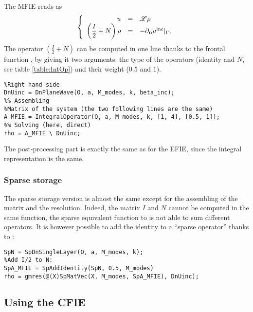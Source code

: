 The MFIE reads as
$$
\left\{\begin{array}{r c l}
u &=& {\mathscr L}\rho\\
\displaystyle \left(\frac{I}{2}+N\right)\rho &=& -\partial_{\mathbf{n}}u^{\textrm{inc}}|_{\Gamma}.
\end{array}\right.
$$
The operator $\left(\frac{I}{2}+N\right)$ can be computed in one line thanks to the frontal function \IntegralOperator, by giving it two arguments: the type of the operators (identity and $N$, see table \ref{table:IntOp}) and their weight ($0.5$ and $1$). 
\begin{lstlisting}
%Right hand side
DnUinc = DnPlaneWave(O, a, M_modes, k, beta_inc);
%% Assembling
%Matrix of the system (the two following lines are the same)
A_MFIE = IntegralOperator(O, a, M_modes, k, [1, 4], [0.5, 1]);
%% Solving (here, direct)
rho = A_MFIE \ DnUinc;
\end{lstlisting}

The post-processing part is exactly the same as for the EFIE, since the integral representation is the same.

\subsubsection{Sparse storage}

The sparse storage version is almost the same except for the assembling of the matrix and the resolution. Indeed, the matrix $I$ and $N$ cannot be computed in the same function, the sparse equivalent function \SpIntegralOperator to \IntegralOperator is not able to sum different operators. It is however possible to add the identity to a ``sparse operator'' thanks to \SpAddIdentity:
\begin{lstlisting}
SpN = SpDnSingleLayer(O, a, M_modes, k);
%Add I/2 to N:
SpA_MFIE = SpAddIdentity(SpN, 0.5, M_modes)
rho = gmres(@(X)SpMatVec(X, M_modes, SpA_MFIE), DnUinc);
\end{lstlisting}


\subsection{Using the CFIE}


